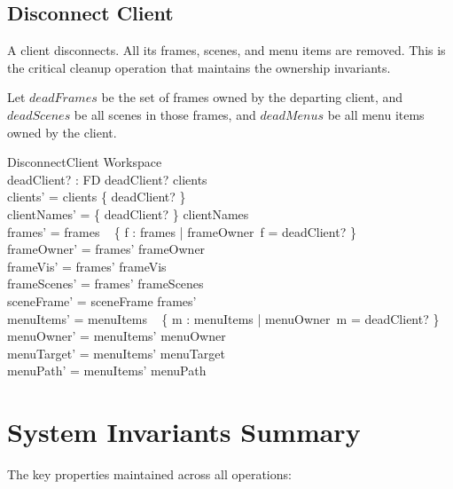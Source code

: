 \documentclass[a4paper,10pt,fleqn]{article}
\begin{document}
\subsection{Disconnect Client}

A client disconnects.  All its frames, scenes, and menu items
are removed.  This is the critical cleanup operation that
maintains the ownership invariants.

Let $deadFrames$ be the set of frames owned by the departing client,
and $deadScenes$ be all scenes in those frames, and $deadMenus$
be all menu items owned by the client.

\begin{schema}{DisconnectClient}
  \Delta Workspace \\
  deadClient? : FD
  \where
  deadClient? \in clients \\
  clients' = clients \setminus \{ deadClient? \} \\
  clientNames' = \{ deadClient? \} \ndres clientNames \\
  frames' = frames \setminus
  \quad~ \{ f : frames | frameOwner~f = deadClient? \} \\
  frameOwner' = frames' \dres frameOwner \\
  frameVis' = frames' \dres frameVis \\
  frameScenes' = frames' \dres frameScenes \\
  sceneFrame' = sceneFrame \rres frames' \\
  menuItems' = menuItems \setminus
  \quad~ \{ m : menuItems | menuOwner~m = deadClient? \} \\
  menuOwner' = menuItems' \dres menuOwner \\
  menuTarget' = menuItems' \dres menuTarget \\
  menuPath' = menuItems' \dres menuPath
\end{schema}

\section{System Invariants Summary}

The key properties maintained across all operations:
\end{document}
